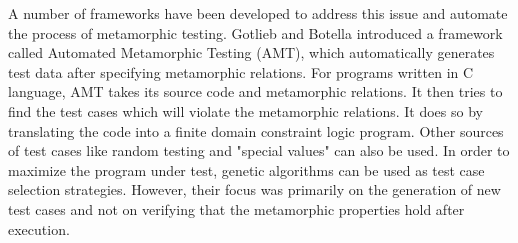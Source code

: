 A number of frameworks have been developed to address this issue and automate the process of metamorphic testing. Gotlieb and Botella \cite{Gotlieb2003} introduced a framework called Automated Metamorphic Testing (AMT), which automatically generates test data after specifying metamorphic relations. 
For programs written in C language, AMT takes its source code and metamorphic relations. It then tries to find the test cases which will violate the metamorphic relations. It does so by translating the code into a finite domain constraint logic program. Other sources of test cases like random testing and "special values" can also be used. In order to maximize the program under test, genetic algorithms can be used as test case selection strategies. However, their focus was primarily on the generation of new test cases and not on verifying that the metamorphic properties hold after execution.

